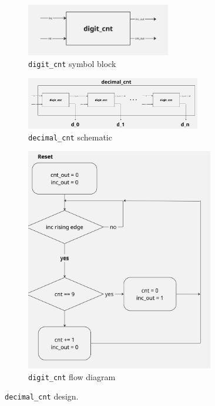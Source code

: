 \documentclass[12pt]{article}   	%
\begin{document}
\begin{figure}[htb]
    \centering
    \begin{subfigure}[t]{0.4\textwidth}
        \centering
        \includegraphics[height=0.9in]{img/digit_cnt_sym}
        \caption{\lstinline{digit_cnt} symbol block}
        \label{fig:digit_cnt_sym}
    \end{subfigure}%
    \begin{subfigure}[t]{0.6\textwidth}
        \centering
        \includegraphics[height=0.9in]{img/decimal_cnt_sch}
        \caption{\lstinline{decimal_cnt} schematic}
        \label{fig:decimal_cnt_sch}
    \end{subfigure}
    \hfill
    \begin{subfigure}[t]{0.6\textwidth}
        \centering
        \includegraphics[width=0.9\textwidth]{img/digit_cnt_diag}
        \caption{\lstinline{digit_cnt} flow diagram}
        \label{fig:digit_cnt_diag}
    \end{subfigure}
    \caption{\lstinline{decimal_cnt} design.}
    \label{fig:decimal_cnt_figs}
\end{figure}
\end{document}
